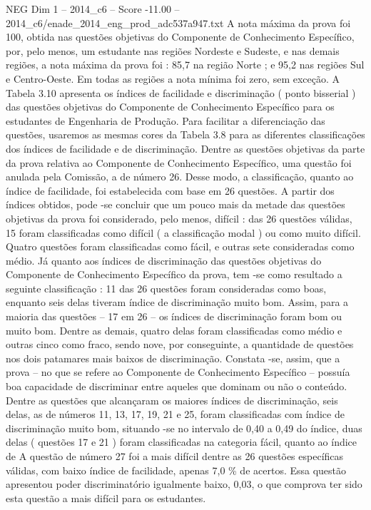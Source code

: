 \begin{textsample}{NEG Dim 1 – 2014\_c6 – Score -11.00 – 2014\_c6/enade\_2014\_eng\_prod\_adc537a947.txt}
A nota máxima da prova foi 100, obtida nas questões objetivas do Componente de Conhecimento Específico, por, pelo menos, um estudante nas regiões Nordeste e Sudeste, e nas demais regiões, a nota máxima da prova foi : 85,7 na região Norte ; e 95,2 nas regiões Sul e Centro-Oeste.
Em todas as regiões a nota mínima foi zero, sem exceção.
A Tabela 3.10 apresenta os índices de facilidade e discriminação ( ponto bisserial ) das questões objetivas do Componente de Conhecimento Específico para os estudantes de Engenharia de Produção.
Para facilitar a diferenciação das questões, usaremos as mesmas cores da Tabela 3.8 para as diferentes classificações dos índices de facilidade e de discriminação.
Dentre as questões objetivas da parte da prova relativa ao Componente de Conhecimento Específico, uma questão foi anulada pela Comissão, a de número 26.
Desse modo, a classificação, quanto ao índice de facilidade, foi estabelecida com base em 26 questões.
A partir dos índices obtidos, pode -se concluir que um pouco mais da metade das questões objetivas da prova foi considerado, pelo menos, difícil : das 26 questões válidas, 15 foram classificadas como difícil ( a classificação modal ) ou como muito difícil.
Quatro questões foram classificadas como fácil, e outras sete consideradas como médio.
Já quanto aos índices de discriminação das questões objetivas do Componente de Conhecimento Específico da prova, tem -se como resultado a seguinte classificação : 11 das 26 questões foram consideradas como boas, enquanto seis delas tiveram índice de discriminação muito bom.
Assim, para a maioria das questões – 17 em 26 – os índices de discriminação foram bom ou muito bom.
Dentre as demais, quatro delas foram classificadas como médio e outras cinco como fraco, sendo nove, por conseguinte, a quantidade de questões nos dois patamares mais baixos de discriminação.
Constata -se, assim, que a prova – no que se refere ao Componente de Conhecimento Específico – possuía boa capacidade de discriminar entre aqueles que dominam ou não o conteúdo.
Dentre as questões que alcançaram os maiores índices de discriminação, seis delas, as de números 11, 13, 17, 19, 21 e 25, foram classificadas com índice de discriminação muito bom, situando -se no intervalo de 0,40 a 0,49 do índice, duas delas ( questões 17 e 21 ) foram classificadas na categoria fácil, quanto ao índice de A questão de número 27 foi a mais difícil dentre as 26 questões específicas válidas, com baixo índice de facilidade, apenas 7,0 \% de acertos.
Essa questão apresentou poder discriminatório igualmente baixo, 0,03, o que comprova ter sido esta questão a mais difícil para os estudantes.

\end{textsample}
